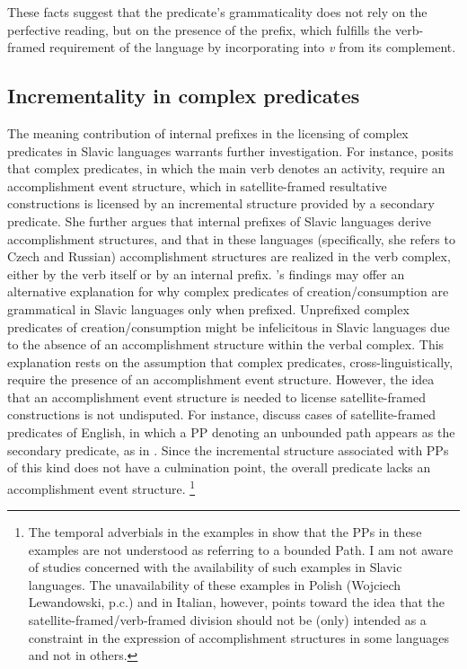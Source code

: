 \documentclass[output=paper,colorlinks,citecolor=brown]{langscibook}
\begin{document}
\noindent These facts suggest that the predicate's grammaticality does not rely on the %
perfective reading, but on the presence of the prefix, which fulfills the verb-framed requirement of the language by incorporating into \textit{v} from its complement.%

\subsection{Incrementality in complex predicates}\label{4.3}

The meaning contribution of internal prefixes in the licensing of complex predicates in Slavic languages warrants further investigation. For instance, \citet{big:Gehrke2008} posits that complex predicates, in which the main verb denotes an activity, require an accomplishment event structure, which in satellite-framed resultative constructions is licensed by an incremental structure provided by a secondary predicate. She further argues that internal prefixes of Slavic languages derive accomplishment structures, and that in these languages (specifically, she refers to Czech and Russian) accomplishment structures are realized in the verb complex, either by the verb itself or by an internal prefix. \citeauthor{big:Gehrke2008}'s findings may offer an alternative explanation for why complex predicates of creation/consumption are grammatical in Slavic languages only when prefixed. Unprefixed complex predicates of creation/consumption might be infelicitous in Slavic languages due to the absence of an accomplishment structure within the verbal complex. This explanation rests on the assumption that complex predicates, cross-linguistically, require the presence of an accomplishment event structure. However, the idea that an accomplishment event structure is needed to license satellite-framed constructions is not undisputed. For instance, \citet{FolliAndHarley2006} discuss cases of satellite-framed predicates of English, in which a PP denoting an unbounded path appears as the secondary predicate, as in . Since the incremental structure associated with PPs of this kind does not have a culmination point, the overall predicate lacks an accomplishment event structure.%
\footnote{The temporal adverbials in the examples in  show that the PPs in these examples are not understood as referring to a bounded Path. I am not aware of studies concerned with the availability of such examples in Slavic languages. The unavailability of these examples in Polish (Wojciech Lewandowski, p.c.) and in Italian, however, points toward the idea that the satellite-framed/verb-framed division should not be (only) intended as a constraint in the expression of accomplishment structures in some languages and not in others.}
\end{document}
